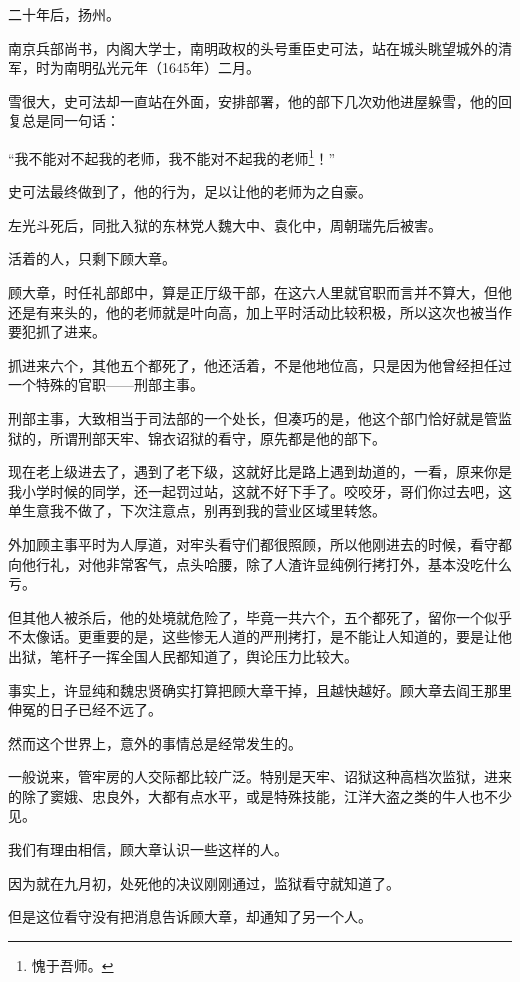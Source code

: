 \begin{multicols}{\theparacolNo}
		二十年后，扬州。

		南京兵部尚书，内阁大学士，南明政权的头号重臣史可法，站在城头眺望城外的清军，时为南明弘光元年（1645年）二月。

		雪很大，史可法却一直站在外面，安排部署，他的部下几次劝他进屋躲雪，他的回复总是同一句话：

		“我不能对不起我的老师，我不能对不起我的老师\footnote{愧于吾师。}！”

		史可法最终做到了，他的行为，足以让他的老师为之自豪。

		左光斗死后，同批入狱的东林党人魏大中、袁化中，周朝瑞先后被害。

		活着的人，只剩下顾大章。

		顾大章，时任礼部郎中，算是正厅级干部，在这六人里就官职而言并不算大，但他还是有来头的，他的老师就是叶向高，加上平时活动比较积极，所以这次也被当作要犯抓了进来。

		抓进来六个，其他五个都死了，他还活着，不是他地位高，只是因为他曾经担任过一个特殊的官职——刑部主事。

		刑部主事，大致相当于司法部的一个处长，但凑巧的是，他这个部门恰好就是管监狱的，所谓刑部天牢、锦衣诏狱的看守，原先都是他的部下。

		现在老上级进去了，遇到了老下级，这就好比是路上遇到劫道的，一看，原来你是我小学时候的同学，还一起罚过站，这就不好下手了。咬咬牙，哥们你过去吧，这单生意我不做了，下次注意点，别再到我的营业区域里转悠。

		外加顾主事平时为人厚道，对牢头看守们都很照顾，所以他刚进去的时候，看守都向他行礼，对他非常客气，点头哈腰，除了人渣许显纯例行拷打外，基本没吃什么亏。

		但其他人被杀后，他的处境就危险了，毕竟一共六个，五个都死了，留你一个似乎不太像话。更重要的是，这些惨无人道的严刑拷打，是不能让人知道的，要是让他出狱，笔杆子一挥全国人民都知道了，舆论压力比较大。

		事实上，许显纯和魏忠贤确实打算把顾大章干掉，且越快越好。顾大章去阎王那里伸冤的日子已经不远了。

		然而这个世界上，意外的事情总是经常发生的。

		一般说来，管牢房的人交际都比较广泛。特别是天牢、诏狱这种高档次监狱，进来的除了窦娥、忠良外，大都有点水平，或是特殊技能，江洋大盗之类的牛人也不少见。

		我们有理由相信，顾大章认识一些这样的人。

		因为就在九月初，处死他的决议刚刚通过，监狱看守就知道了。

		但是这位看守没有把消息告诉顾大章，却通知了另一个人。


\end{multicols}
